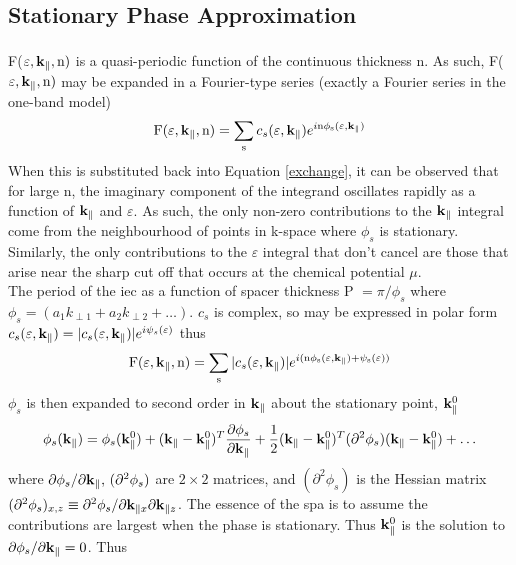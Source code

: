 \documentclass[a4paper, 12pt]{article}
\newcommand{\site}[1]{\textsuperscript{\textcolor{blue}{\cite{#1}}}}
\begin{document}
	\subsection{Stationary Phase Approximation}
	F($\varepsilon, \rm \bf k_\parallel, \rm n)$ is a quasi-periodic function of the continuous thickness n\site{rev3}. As such, F($\varepsilon, \rm \bf k_\parallel, \rm n)$ may be expanded in a Fourier-type series (exactly a Fourier series in the one-band model)
\begin{equation}
	\rm F(\varepsilon, \bf k_\parallel, \rm n) = \sum_s \mathnormal{c_s(\varepsilon, {\bf k}_\parallel) e^{i\rm n \phi_s(\varepsilon, \bf k_\parallel)}}
\end{equation}
When this is substituted back into Equation \eqref{exchange}, it can be observed that for large n, the imaginary component of the integrand oscillates rapidly as a function of $\rm \bf k_\parallel$ and $\varepsilon$. As such, the only non-zero contributions to the $\rm \bf k_\parallel$ integral come from the neighbourhood of points in k-space where $\phi_s$ is stationary. Similarly, the only contributions to the $\varepsilon$ integral that don't cancel are those that arise near the sharp cut off that occurs at the chemical potential $\mu$.
\\[3mm]
The period of the \gls{iec} as a function of spacer thickness P $= \pi/\phi_s$ where $\phi_s = (a_1k_{\perp 1} + a_2k_{\perp 2} + \dots)$.
$c_s$ is complex, so may be expressed in polar form $c_s(\varepsilon, {\bf k_\parallel)} = |c_s(\varepsilon,{\bf k_\parallel)}|e^{i \psi_s (\varepsilon)}$ thus
\begin{equation}
	\rm F(\varepsilon, \bf k_\parallel, \rm n) = \sum_s \mathnormal{|c_s(\varepsilon, {\bf k_\parallel)}| e^{i\rm (n \phi_s(\varepsilon, {\bf k_\parallel})+ \psi_s(\varepsilon))}}
\end{equation}
$\phi_s$ is then expanded to second order in $\bf k_\parallel$ about the stationary point, ${\bf k}_\parallel^0$
\begin{multline}
	\phi_s({\bf k_\parallel}) = \phi_s({\bf k}_\parallel^0) + ({\bf k}_\parallel - {\bf k}_\parallel^0)^T\frac{\partial \phi_s}{\partial{\bf k}_\parallel }+ \frac{1}{2}({\bf k}_\parallel - {\bf k}_\parallel^0)^T(\partial^2\phi_s) ({\bf k}_\parallel - {\bf k}_\parallel^0) + \dots
\end{multline}
where $\partial \phi_s/\partial{\bf k}_\parallel,\,(\partial^2\phi_s)$ are $2\times2$ matrices, and $(\partial^2 \phi_s)$ is the Hessian matrix $(\partial^2\phi_s)_{x, z} \equiv \partial^2\phi_s/\partial{\rm \bf k_{\parallel \mathnormal x}}\partial{\rm \bf k_{\parallel \mathnormal z}}$. The essence of the \acrfull{spa} is to assume the contributions are largest when the phase is stationary. Thus ${\bf k}_\parallel^0$ is the solution to ${\partial \phi_s}/{\partial{\bf k}_\parallel } = 0$. Thus
\end{document}
